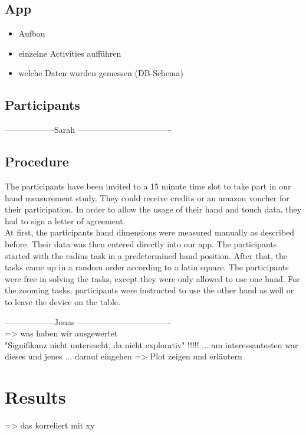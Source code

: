 \documentclass{sigchi}
\begin{document}
\subsection{App}
\begin{itemize}
\item Aufbau
\item einzelne Activities aufführen
\item welche Daten wurden gemessen (DB-Schema)
\end{itemize}

\subsection{Participants}

------------------Sarah ----------------------------------
\subsection{Procedure}
The participants have been invited to a 15 minute time slot to take part in our hand measurement study. They could receive credits or an amazon voucher for their participation. In order to allow the usage of their hand and touch data, they had to sign a letter of agreement.\\
At first, the participants hand dimensions were measured manually as described before. Their data was then entered directly into our app. The participants started with the radius task in a predetermined hand position. After that, the tasks came up in a random order according to a latin square. The participants were free in solving the tasks, except they were only allowed to use one hand. For the zooming tasks, participants were instructed to use the other hand as well or to leave the device on the table.

------------------Jonas ----------------------------------\\
=> was haben wir ausgewertet\\
"Signifikanz nicht untersucht, da nicht explorativ" !!!!! ... am interessantesten war dieses und jenes ... darauf eingehen => Plot zeigen und erläutern

\section{Results}
=> das korreliert mit xy
\end{document}
